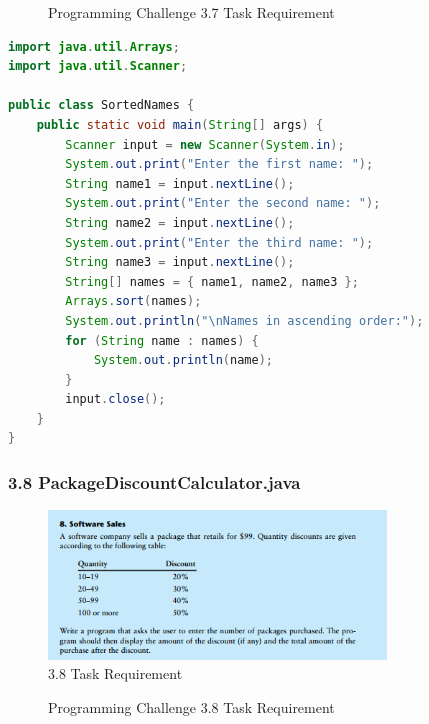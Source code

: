 \documentclass{article}
\begin{document}
\begin{figure}[h]
    \centering
    \caption{Programming Challenge 3.7 Task Requirement}
\end{figure}

\begin{lstlisting}[language=Java, caption=SortedNames.java]
import java.util.Arrays;
import java.util.Scanner;

public class SortedNames {
    public static void main(String[] args) {
        Scanner input = new Scanner(System.in);
        System.out.print("Enter the first name: ");
        String name1 = input.nextLine();
        System.out.print("Enter the second name: ");
        String name2 = input.nextLine();
        System.out.print("Enter the third name: ");
        String name3 = input.nextLine();
        String[] names = { name1, name2, name3 };
        Arrays.sort(names);
        System.out.println("\nNames in ascending order:");
        for (String name : names) {
            System.out.println(name);
        }
        input.close();
    }
}
\end{lstlisting}

\subsubsection*{3.8 PackageDiscountCalculator.java}
\begin{figure}[H]
    \centering
    \includegraphics[width=0.8\textwidth]{./Assets/Task requirements/Assignment3/3.8.png}
    \caption{3.8 Task Requirement}
\end{figure}
\begin{figure}[h]
    \centering
    \caption{Programming Challenge 3.8 Task Requirement}
\end{figure}
\end{document}
